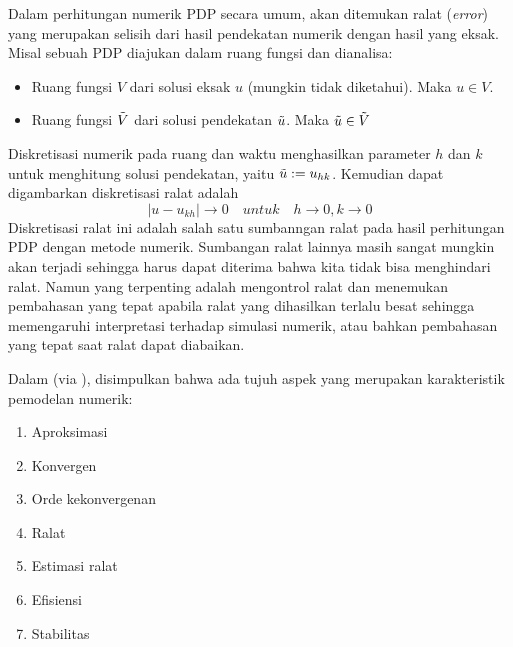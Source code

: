 Dalam perhitungan numerik PDP secara umum, akan ditemukan ralat (\emph{error}) yang merupakan selisih dari hasil pendekatan numerik dengan hasil yang eksak. Misal sebuah PDP diajukan dalam ruang fungsi dan dianalisa:
\begin{itemize}
    \item Ruang fungsi $V$ dari solusi eksak $u$ (mungkin tidak diketahui). Maka $u \in V$.
    \item Ruang fungsi $\Tilde{V}$ dari solusi pendekatan $\Tilde{u}$. Maka $\Tilde{u} \in \Tilde{V}$
\end{itemize}
Diskretisasi numerik pada ruang dan waktu menghasilkan parameter $h$ dan $k$ untuk menghitung solusi pendekatan, yaitu $\Tilde{u}:=u_{hk}$. Kemudian dapat digambarkan diskretisasi ralat adalah
\begin{equation}
    \left \lvert u - u_{kh} \right \rvert \rightarrow  0 \quad untuk \quad  h \rightarrow 0, k \rightarrow 0
\end{equation}
Diskretisasi ralat ini adalah salah satu sumbanngan ralat pada hasil perhitungan PDP dengan metode numerik. Sumbangan ralat lainnya masih sangat mungkin akan terjadi sehingga harus dapat diterima bahwa kita tidak bisa menghindari ralat. Namun yang terpenting adalah mengontrol ralat dan menemukan pembahasan yang tepat apabila ralat yang dihasilkan terlalu besat sehingga memengaruhi interpretasi terhadap simulasi numerik, atau bahkan pembahasan yang tepat saat ralat dapat diabaikan.

Dalam \cite{richter_2017_einfhrung} (via \cite{wick_2022_numerical}), disimpulkan bahwa ada tujuh aspek yang merupakan karakteristik pemodelan numerik:
\begin{enumerate}
    \item Aproksimasi
    \item Konvergen
    \item Orde kekonvergenan
    \item Ralat
    \item Estimasi ralat
    \item Efisiensi
    \item Stabilitas
\end{enumerate}

